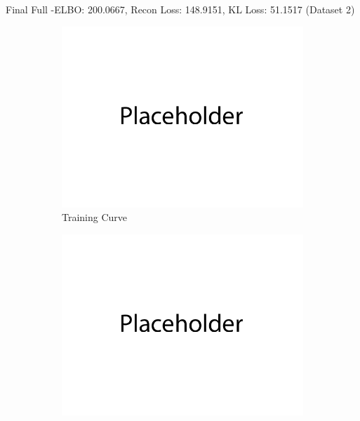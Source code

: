 \documentclass{article}
\begin{document}
\begin{enumerate}[(a)]
           \newpage

           Final Full -ELBO: 200.0667, Recon Loss: 148.9151, KL Loss: 51.1517 (Dataset 2)
           \begin{figure}[H]
                  \centering
                  \begin{subfigure}[b]{0.475\textwidth}
                      \centering
                      \includegraphics[width=\textwidth]{figures/q2_b_dset2_train_plot.png}
                      \caption{Training Curve}
                  \end{subfigure}
                  \hfill
                  \begin{subfigure}[b]{0.475\textwidth}
                      \centering
                      \includegraphics[width=\textwidth]{figures/q2_b_dset2_samples.png}

\end{subfigure}
\end{figure}
\end{enumerate}
\end{document}
